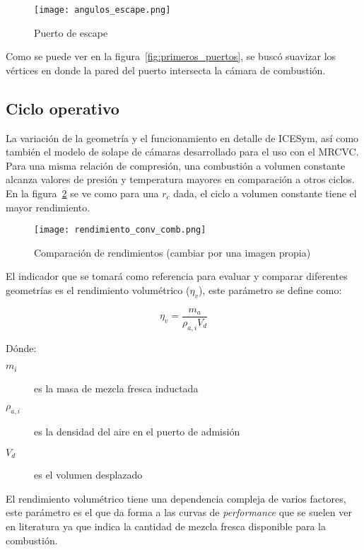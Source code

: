 \begin{figure}
    \centering
    \texttt{[image: angulos\_escape.png]}
    \caption{Puerto de escape}\label{fig:angulos_escape}
\end{figure}

Como se puede ver en la figura~\ref{fig:primeros_puertos}, se buscó suavizar los
vértices en donde la pared del puerto intersecta la cámara de combustión.

\subsection{Ciclo operativo}
%
La variación de la geometría y el funcionamiento en detalle de ICESym, así como
también el modelo de solape de cámaras desarrollado para el uso con el MRCVC.\@
%
Para una misma relación de compresión, una combustión a volumen constante
alcanza valores de presión y temperatura mayores en comparación a otros ciclos.
%
En la figura~\ref{fig:comparacion_rendimientos} se ve como para una $r_c$ dada,
el ciclo a volumen constante tiene el mayor rendimiento.

\begin{figure}
    \centering
    \texttt{[image: rendimiento\_conv\_comb.png]}
    \caption{Comparación de rendimientos (cambiar por una imagen propia)}\label{fig:comparacion_rendimientos}
\end{figure}

El indicador que se tomará como referencia para evaluar y comparar diferentes
geometrías es el rendimiento volumétrico ($\eta_v$), este parámetro se define
como:

\begin{equation}
    \eta_v = \frac{m_a}{\rho_{a,i}V_d}
\end{equation}

Dónde:
%
\begin{description}
    \item[$m_i$] es la masa de mezcla fresca inductada
    \item[$\rho_{a,i}$] es la densidad del aire en el puerto de admisión
    \item[$V_d$] es el volumen desplazado
\end{description}

El rendimiento volumétrico tiene una dependencia compleja de varios factores,
este parámetro es el que da forma a las curvas de \emph{performance} que se
suelen ver en literatura ya que indica la cantidad de mezcla fresca disponible
para la combustión. 
%

